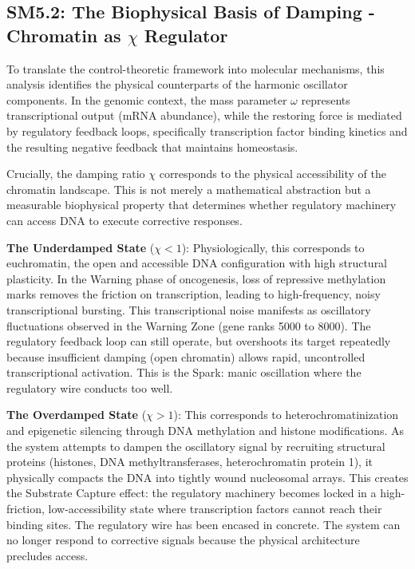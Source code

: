 \documentclass[11pt,letterpaper]{article}
\begin{document}
\subsection{SM5.2: The Biophysical Basis of Damping - Chromatin as $\chi$ Regulator}

To translate the control-theoretic framework into molecular mechanisms, this analysis identifies the physical counterparts of the harmonic oscillator components. In the genomic context, the mass parameter $\omega$ represents transcriptional output (mRNA abundance), while the restoring force is mediated by regulatory feedback loops, specifically transcription factor binding kinetics and the resulting negative feedback that maintains homeostasis.

Crucially, the damping ratio $\chi$ corresponds to the physical accessibility of the chromatin landscape. This is not merely a mathematical abstraction but a measurable biophysical property that determines whether regulatory machinery can access DNA to execute corrective responses.

\textbf{The Underdamped State} ($\chi < 1$): Physiologically, this corresponds to euchromatin, the open and accessible DNA configuration with high structural plasticity. In the Warning phase of oncogenesis, loss of repressive methylation marks removes the friction on transcription, leading to high-frequency, noisy transcriptional bursting. This transcriptional noise manifests as oscillatory fluctuations observed in the Warning Zone (gene ranks 5000 to 8000). The regulatory feedback loop can still operate, but overshoots its target repeatedly because insufficient damping (open chromatin) allows rapid, uncontrolled transcriptional activation. This is the Spark: manic oscillation where the regulatory wire conducts too well.

\textbf{The Overdamped State} ($\chi > 1$): This corresponds to heterochromatinization and epigenetic silencing through DNA methylation and histone modifications. As the system attempts to dampen the oscillatory signal by recruiting structural proteins (histones, DNA methyltransferases, heterochromatin protein 1), it physically compacts the DNA into tightly wound nucleosomal arrays. This creates the Substrate Capture effect: the regulatory machinery becomes locked in a high-friction, low-accessibility state where transcription factors cannot reach their binding sites. The regulatory wire has been encased in concrete. The system can no longer respond to corrective signals because the physical architecture precludes access.
\end{document}
